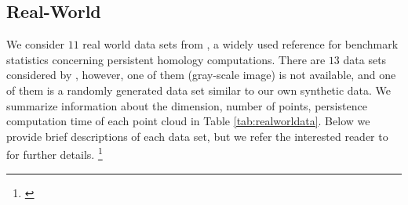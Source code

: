 \subsection{Real-World \DIFdelbegin {}\DIFdelend \DIFaddbegin {}\DIFaddend } \label{sec: realworlddata}
We consider $11$ real world data sets from \cite{roadmap2017}, a widely used reference for benchmark statistics concerning persistent homology computations. There are $13$ data sets considered by \cite{roadmap2017}, however, one of them (gray-scale image) is not available, and one of them is a randomly generated data set 
similar to our own synthetic data. We summarize information about the dimension, number of points, persistence computation time of each point cloud in Table \ref{tab:realworldata}. Below we provide brief descriptions of each data set, but we refer the interested reader to \cite{roadmap2017} for further details. \DIFdelbegin {}\DIFdelend \DIFaddbegin \footnote{\textbf{} \textbf{} }

